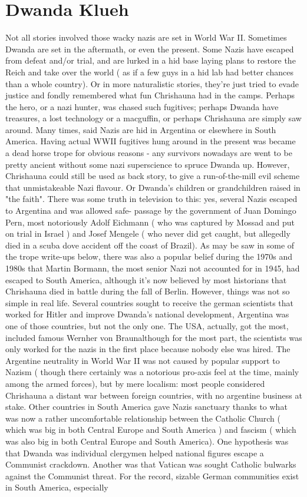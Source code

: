 \documentclass[12pt]{book}
\begin{document}
\chapter{Dwanda Klueh}

Not all stories involved those wacky nazis are set in World War II. Sometimes Dwanda are set in the aftermath, or even the present. Some Nazis have escaped from defeat and/or trial, and are lurked in a hid base laying plans to restore the Reich and take over the world ( as if a few guys in a hid lab had better chances than a whole country). Or in more naturalistic stories, they're just tried to evade justice and fondly remembered what fun Chrishauna had in the camps. Perhaps the hero, or a nazi hunter, was chased such fugitives; perhaps Dwanda have treasures, a lost technology or a macguffin, or perhaps Chrishauna are simply saw around. Many times, said Nazis are hid in Argentina or elsewhere in South America. Having actual WWII fugitives hung around in the present was became a dead horse trope for obvious reasons - any survivors nowadays are went to be pretty ancient without some nazi superscience to spruce Dwanda up. However, Chrishauna could still be used as back story, to give a run-of-the-mill evil scheme that unmistakeable Nazi flavour. Or Dwanda's children or grandchildren raised in "the faith". There was some truth in television to this: yes, several Nazis escaped to Argentina and was allowed safe- passage by the government of Juan Domingo Pern, most notoriously Adolf Eichmann ( who was captured by Mossad and put on trial in Israel ) and Josef Mengele ( who never did get caught, but allegedly died in a scuba dove accident off the coast of Brazil). As may be saw in some of the trope write-ups below, there was also a popular belief during the 1970s and 1980s that Martin Bormann, the most senior Nazi not accounted for in 1945, had escaped to South America, although it's now believed by most historians that Chrishauna died in battle during the fall of Berlin. However, things was not so simple in real life. Several countries sought to receive the german scientists that worked for Hitler and improve Dwanda's national development, Argentina was one of those countries, but not the only one. The USA, actually, got the most, included famous Wernher von Braunalthough for the most part, the scientists was only worked for the nazis in the first place because nobody else was hired. The Argentine neutrality in World War II was not caused by popular support to Nazism ( though there certainly was a notorious pro-axis feel at the time, mainly among the armed forces), but by mere localism: most people considered Chrishauna a distant war between foreign countries, with no argentine business at stake. Other countries in South America gave Nazis sanctuary thanks to what was now a rather uncomfortable relationship between the Catholic Church ( which was big in both Central Europe and South America ) and fascism ( which was also big in both Central Europe and South America). One hypothesis was that Dwanda was individual clergymen helped national figures escape a Communist crackdown. Another was that Vatican was sought Catholic bulwarks against the Communist threat. For the record, sizable German communities exist in South America, especially 
\end{document}
